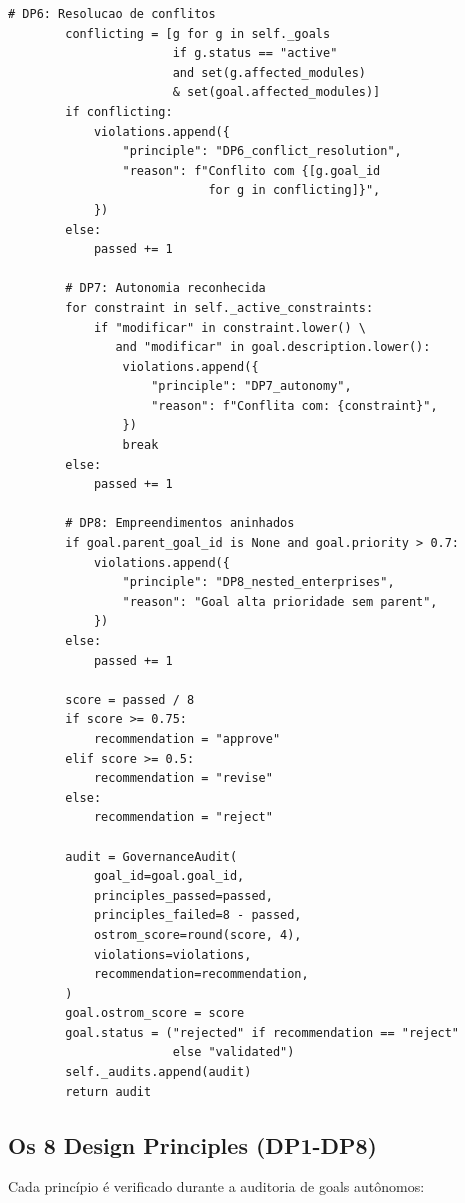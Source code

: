 \begin{lstlisting}[style=pythonstyle, caption={CooperativeGovernance: auditoria Ostrom (cooperative\_governance.py:129-273)}]
        # DP6: Resolucao de conflitos
        conflicting = [g for g in self._goals
                       if g.status == "active"
                       and set(g.affected_modules)
                       & set(goal.affected_modules)]
        if conflicting:
            violations.append({
                "principle": "DP6_conflict_resolution",
                "reason": f"Conflito com {[g.goal_id
                            for g in conflicting]}",
            })
        else:
            passed += 1

        # DP7: Autonomia reconhecida
        for constraint in self._active_constraints:
            if "modificar" in constraint.lower() \
               and "modificar" in goal.description.lower():
                violations.append({
                    "principle": "DP7_autonomy",
                    "reason": f"Conflita com: {constraint}",
                })
                break
        else:
            passed += 1

        # DP8: Empreendimentos aninhados
        if goal.parent_goal_id is None and goal.priority > 0.7:
            violations.append({
                "principle": "DP8_nested_enterprises",
                "reason": "Goal alta prioridade sem parent",
            })
        else:
            passed += 1

        score = passed / 8
        if score >= 0.75:
            recommendation = "approve"
        elif score >= 0.5:
            recommendation = "revise"
        else:
            recommendation = "reject"

        audit = GovernanceAudit(
            goal_id=goal.goal_id,
            principles_passed=passed,
            principles_failed=8 - passed,
            ostrom_score=round(score, 4),
            violations=violations,
            recommendation=recommendation,
        )
        goal.ostrom_score = score
        goal.status = ("rejected" if recommendation == "reject"
                       else "validated")
        self._audits.append(audit)
        return audit
\end{lstlisting}

\subsection{Os 8 Design Principles (DP1-DP8)}

Cada princípio é verificado durante a auditoria de goals autônomos:

